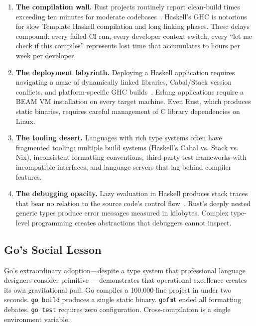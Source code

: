 \documentclass[11pt,twocolumn]{article}
\begin{document}
\begin{enumerate}[leftmargin=*]
\item \textbf{The compilation wall.} Rust projects routinely report clean-build times exceeding ten minutes for moderate codebases~\citep{rust-compile-survey-2023}. Haskell's GHC is notorious for slow Template Haskell compilation and long linking phases. These delays compound: every failed CI run, every developer context switch, every ``let me check if this compiles'' represents lost time that accumulates to hours per week per developer.

\item \textbf{The deployment labyrinth.} Deploying a Haskell application requires navigating a maze of dynamically linked libraries, Cabal/Stack version conflicts, and platform-specific GHC builds~\citep{snoyman2017haskell-deployment}. Erlang applications require a BEAM VM installation on every target machine. Even Rust, which produces static binaries, requires careful management of C library dependencies on Linux.

\item \textbf{The tooling desert.} Languages with rich type systems often have fragmented tooling: multiple build systems (Haskell's Cabal vs. Stack vs. Nix), inconsistent formatting conventions, third-party test frameworks with incompatible interfaces, and language servers that lag behind compiler features.

\item \textbf{The debugging opacity.} Lazy evaluation in Haskell produces stack traces that bear no relation to the source code's control flow~\citep{allwood2009stack-traces}. Rust's deeply nested generic types produce error messages measured in kilobytes. Complex type-level programming creates abstractions that debuggers cannot inspect.
\end{enumerate}

\subsection{Go's Social Lesson}

Go's extraordinary adoption---despite a type system that professional language designers consider primitive~\citep{griesemer2020generics}---demonstrates that operational excellence creates its own gravitational pull.
Go compiles a 100,000-line project in under two seconds.
\texttt{go build} produces a single static binary.
\texttt{gofmt} ended all formatting debates.
\texttt{go test} requires zero configuration.
Cross-compilation is a single environment variable.
\end{document}
